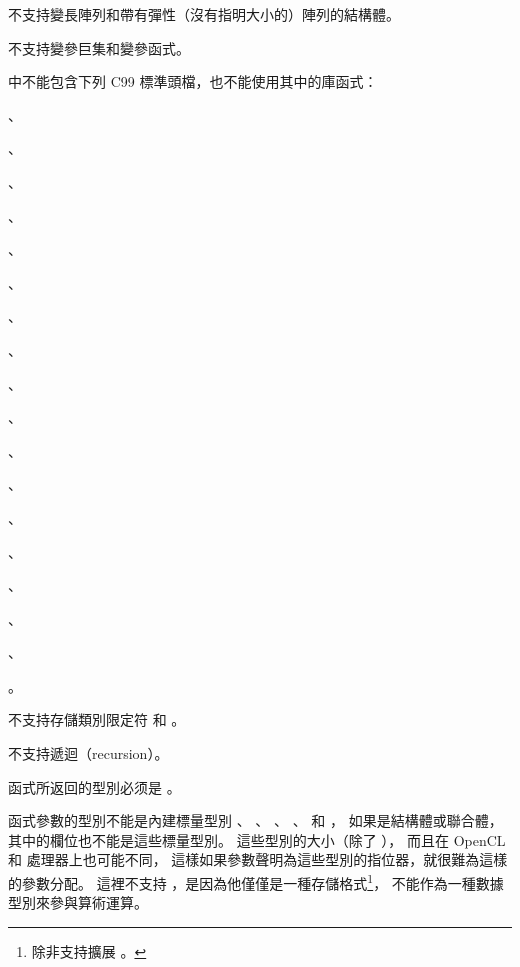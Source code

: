 不支持變長陣列和帶有彈性（沒有指明大小的）陣列的結構體。
\stopitem

\startitem
不支持變參巨集和變參函式。
\stopitem

\startitem
{}中不能包含下列 C99 標準頭檔，也不能使用其中的庫函式：
\startigBase
\item {}、
\item {}、
\item {}、
\item {}、
\item {}、
\item {}、
\item {}、
\item {}、
\item {}、
\item {}、
\item {}、
\item {}、
\item {}、
\item {}、
\item {}、
\item {}、
\item {}、
\item {}
\item {}。
\stopigBase
\stopitem

\startitem
不支持存儲類別限定符  和 。
\stopitem


\startitem
不支持遞迴（recursion）。
\stopitem

\startitem
{}函式所返回的型別必须是 。
\stopitem

\startitem
{}函式參數的型別不能是內建標量型別
 、 、 、 、
  和 ，
如果是結構體或聯合體，其中的欄位也不能是這些標量型別。
這些型別的大小（除了 ），
而且在 OpenCL  和  處理器上也可能不同，
這樣如果參數聲明為這些型別的指位器，就很難為這樣的參數分配。
這裡不支持 ，是因為他僅僅是一種存儲格式\footnote{
除非支持擴展 。}，
不能作為一種數據型別來參與算術運算。
\stopitem

